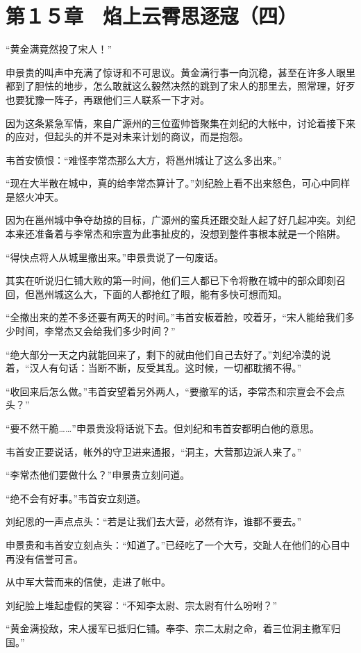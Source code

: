 \section{第１５章　焰上云霄思逐寇（四）}

“黄金满竟然投了宋人！”

申景贵的叫声中充满了惊讶和不可思议。黄金满行事一向沉稳，甚至在许多人眼里都到了胆怯的地步，怎么敢就这么毅然决然的跳到了宋人的那里去，照常理，好歹也要犹豫一阵子，再跟他们三人联系一下才对。

因为这条紧急军情，来自广源州的三位蛮帅皆聚集在刘纪的大帐中，讨论着接下来的应对，但起头的并不是对未来计划的商议，而是抱怨。

韦首安愤恨：“难怪李常杰那么大方，将邕州城让了这么多出来。”

“现在大半散在城中，真的给李常杰算计了。”刘纪脸上看不出来怒色，可心中同样是怒火冲天。

因为在邕州城中争夺劫掠的目标，广源州的蛮兵还跟交趾人起了好几起冲突。刘纪本来还准备着与李常杰和宗亶为此事扯皮的，没想到整件事根本就是一个陷阱。

“得快点将人从城里撤出来。”申景贵说了一句废话。

其实在听说归仁铺大败的第一时间，他们三人都已下令将散在城中的部众即刻召回，但邕州城这么大，下面的人都抢红了眼，能有多快可想而知。

“全撤出来的差不多还要有两天的时间。”韦首安板着脸，咬着牙，“宋人能给我们多少时间，李常杰又会给我们多少时间？”

“绝大部分一天之内就能回来了，剩下的就由他们自己去好了。”刘纪冷漠的说着，“汉人有句话：当断不断，反受其乱。这时候，一切都耽搁不得。”

“收回来后怎么做。”韦首安望着另外两人，“要撤军的话，李常杰和宗亶会不会点头？”

“要不然干脆……”申景贵没将话说下去。但刘纪和韦首安都明白他的意思。

韦首安正要说话，帐外的守卫进来通报，“洞主，大营那边派人来了。”

“李常杰他们要做什么？”申景贵立刻问道。

“绝不会有好事。”韦首安立刻道。

刘纪恩的一声点点头：“若是让我们去大营，必然有诈，谁都不要去。”

申景贵和韦首安立刻点头：“知道了。”已经吃了一个大亏，交趾人在他们的心目中再没有信誉可言。

从中军大营而来的信使，走进了帐中。

刘纪脸上堆起虚假的笑容：“不知李太尉、宗太尉有什么吩咐？”

“黄金满投敌，宋人援军已抵归仁铺。奉李、宗二太尉之命，着三位洞主撤军归国。”

